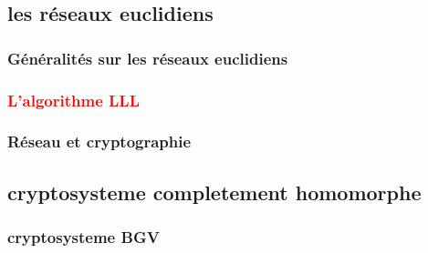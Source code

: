 \documentclass[a4paper,11pt]{report}
\begin{document}
\subsection*{les réseaux euclidiens}
\subsubsection*{Généralités sur les réseaux euclidiens}
\subsubsection*{\textcolor{red}{L'algorithme LLL}}
\subsubsection*{Réseau et cryptographie}
\subsection*{cryptosysteme completement homomorphe}
\subsubsection*{cryptosysteme BGV}
\end{document}
